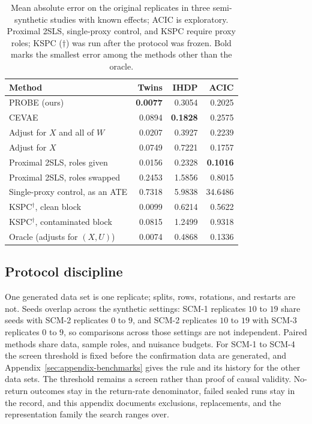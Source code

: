 \begin{table}[t]
\caption{Mean absolute error on the original replicates in three semi-synthetic studies with known effects; ACIC is exploratory. Proximal 2SLS, single-proxy control, and KSPC require proxy roles; KSPC ($\dagger$) was run after the protocol was frozen. Bold marks the smallest error among the methods other than the oracle.}
\label{tab:benchmarks}
\centering
\footnotesize
\begin{tabular}{lrrr}
\toprule
Method & Twins & IHDP & ACIC \\
\midrule
PROBE (ours) & \textbf{0.0077} & 0.3054 & 0.2025 \\
CEVAE & 0.0894 & \textbf{0.1828} & 0.2575 \\
Adjust for $X$ and all of $W$ & 0.0207 & 0.3927 & 0.2239 \\
Adjust for $X$ & 0.0749 & 0.7221 & 0.1757 \\
Proximal 2SLS, roles given & 0.0156 & 0.2328 & \textbf{0.1016} \\
Proximal 2SLS, roles swapped & 0.2453 & 1.5856 & 0.8015 \\
Single-proxy control, as an ATE & 0.7318 & 5.9838 & 34.6486 \\
KSPC$^\dagger$, clean block & 0.0099 & 0.6214 & 0.5622 \\
KSPC$^\dagger$, contaminated block & 0.0815 & 1.2499 & 0.9318 \\
\midrule
Oracle (adjusts for $(X,U)$) & 0.0074 & 0.4868 & 0.1336 \\
\bottomrule
\end{tabular}
\end{table}

\subsection{Protocol discipline}

One generated data set is one replicate; splits, rows, rotations, and restarts are not. Seeds overlap across the synthetic settings: SCM-1 replicates $10$ to $19$ share seeds with SCM-2 replicates $0$ to $9$, and SCM-2 replicates $10$ to $19$ with SCM-3 replicates $0$ to $9$, so comparisons across those settings are not independent. Paired methods share data, sample roles, and nuisance budgets. For SCM-1 to SCM-4 the screen threshold is fixed before the confirmation data are generated, and Appendix~\ref{sec:appendix-benchmarks} gives the rule and its history for the other data sets. The threshold remains a screen rather than proof of causal validity. No-return outcomes stay in the return-rate denominator, failed sealed runs stay in the record, and this appendix documents exclusions, replacements, and the representation family the search ranges over.

